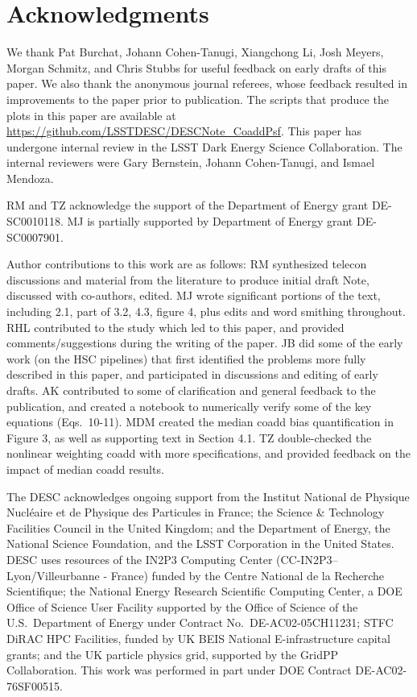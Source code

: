 \documentclass{openjournal}
\newcommand{\irresponse}[1]{{#1}}
\newcommand{\refresponse}[1]{#1}
\begin{document}
\section*{Acknowledgments}

We thank Pat Burchat, Johann Cohen-Tanugi, Xiangchong Li, Josh Meyers, Morgan Schmitz, and Chris Stubbs for useful feedback on early  drafts of this paper. \refresponse{We also thank the anonymous journal referees, whose feedback resulted in improvements to the paper prior to publication.} The scripts that produce the plots in this paper are available at \url{https://github.com/LSSTDESC/DESCNote\_CoaddPsf}.  This paper has undergone internal review in the LSST Dark Energy Science Collaboration. The internal reviewers were \irresponse{Gary Bernstein, Johann Cohen-Tanugi, and Ismael Mendoza.}

RM and TZ acknowledge the support of the Department of Energy grant DE-SC0010118.
MJ is partially supported by
Department of Energy grant DE-SC0007901.

Author contributions to this work are as follows: RM synthesized telecon discussions and material from the literature to produce initial draft Note, discussed with co-authors, edited.  MJ wrote significant portions of the text, including 2.1, part of 3.2, 4.3, figure 4, plus edits and word smithing throughout.  RHL contributed to the study which led to this paper, and provided comments/suggestions during the writing of the paper. JB did some of the early work (on the HSC pipelines) that first identified the problems more fully described in this paper, and participated in discussions and editing of early drafts.  AK contributed to some of clarification and general feedback to the publication, and created a notebook to numerically verify some of the key equations (Eqs.\ 10-11). MDM created the median coadd bias quantification in Figure 3, as well as supporting text in Section 4.1. TZ double-checked the nonlinear weighting coadd with more specifications, and provided feedback on the impact of median coadd results.

The DESC acknowledges ongoing support from the Institut National de 
Physique Nucl\'eaire et de Physique des Particules in France; the 
Science \& Technology Facilities Council in the United Kingdom; and the
Department of Energy, the National Science Foundation, and the LSST 
Corporation in the United States.  DESC uses resources of the IN2P3 
Computing Center (CC-IN2P3--Lyon/Villeurbanne - France) funded by the 
Centre National de la Recherche Scientifique; the National Energy 
Research Scientific Computing Center, a DOE Office of Science User 
Facility supported by the Office of Science of the U.S.\ Department of
Energy under Contract No.\ DE-AC02-05CH11231; STFC DiRAC HPC Facilities, 
funded by UK BEIS National E-infrastructure capital grants; and the UK 
particle physics grid, supported by the GridPP Collaboration.  This 
work was performed in part under DOE Contract DE-AC02-76SF00515.
\end{document}
